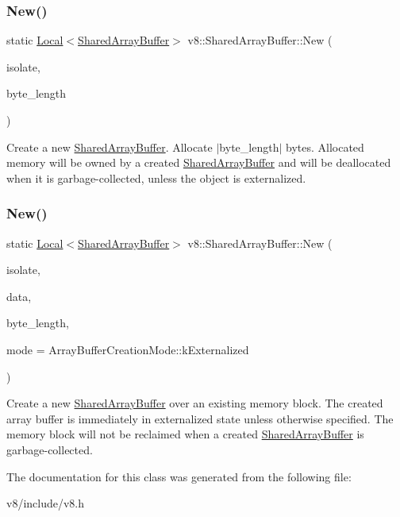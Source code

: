 \subsubsection{\texorpdfstring{New()}{New()}\hspace{0.1cm}{\footnotesize\ttfamily [1/2]}}
{\footnotesize\ttfamily static \mbox{\hyperlink{classv8_1_1Local}{Local}}$<$\mbox{\hyperlink{classv8_1_1SharedArrayBuffer}{Shared\+Array\+Buffer}}$>$ v8\+::\+Shared\+Array\+Buffer\+::\+New (\begin{DoxyParamCaption}\item[{\mbox{\hyperlink{classv8_1_1Isolate}{Isolate}} $\ast$}]{isolate,  }\item[{size\+\_\+t}]{byte\+\_\+length }\end{DoxyParamCaption})\hspace{0.3cm}{\ttfamily [static]}}

Create a new \mbox{\hyperlink{classv8_1_1SharedArrayBuffer}{Shared\+Array\+Buffer}}. Allocate $\vert$byte\+\_\+length$\vert$ bytes. Allocated memory will be owned by a created \mbox{\hyperlink{classv8_1_1SharedArrayBuffer}{Shared\+Array\+Buffer}} and will be deallocated when it is garbage-\/collected, unless the object is externalized. \mbox{\label{classv8_1_1SharedArrayBuffer_af708b1765380ad42b7d572dfc531c21c}} 
\subsubsection{\texorpdfstring{New()}{New()}\hspace{0.1cm}{\footnotesize\ttfamily [2/2]}}
{\footnotesize\ttfamily static \mbox{\hyperlink{classv8_1_1Local}{Local}}$<$\mbox{\hyperlink{classv8_1_1SharedArrayBuffer}{Shared\+Array\+Buffer}}$>$ v8\+::\+Shared\+Array\+Buffer\+::\+New (\begin{DoxyParamCaption}\item[{\mbox{\hyperlink{classv8_1_1Isolate}{Isolate}} $\ast$}]{isolate,  }\item[{void $\ast$}]{data,  }\item[{size\+\_\+t}]{byte\+\_\+length,  }\item[{Array\+Buffer\+Creation\+Mode}]{mode = {\ttfamily ArrayBufferCreationMode\+:\+:kExternalized} }\end{DoxyParamCaption})\hspace{0.3cm}{\ttfamily [static]}}

Create a new \mbox{\hyperlink{classv8_1_1SharedArrayBuffer}{Shared\+Array\+Buffer}} over an existing memory block. The created array buffer is immediately in externalized state unless otherwise specified. The memory block will not be reclaimed when a created \mbox{\hyperlink{classv8_1_1SharedArrayBuffer}{Shared\+Array\+Buffer}} is garbage-\/collected. 

The documentation for this class was generated from the following file\+:\begin{DoxyCompactItemize}
\item 
v8/include/v8.\+h\end{DoxyCompactItemize}
